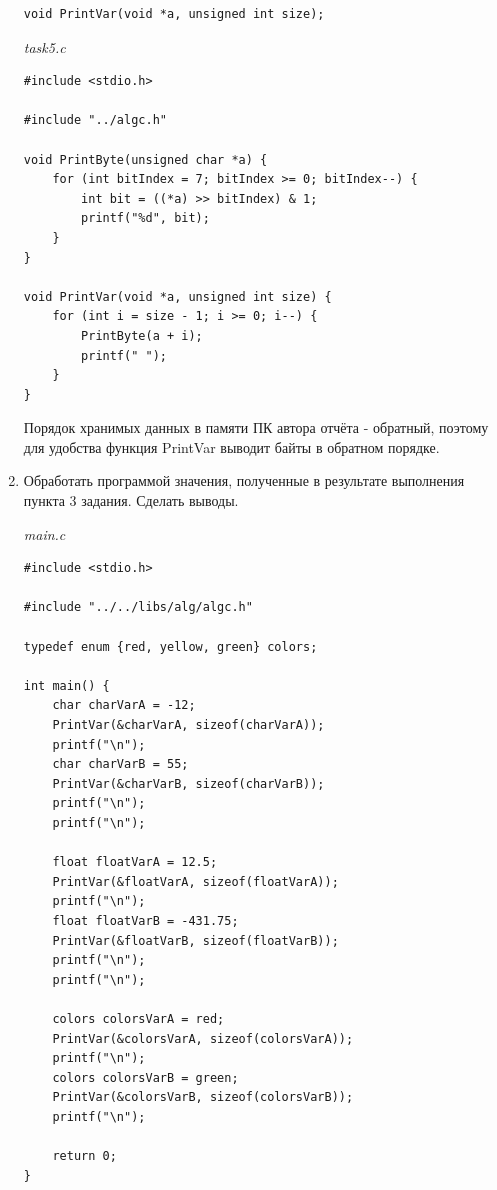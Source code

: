 \documentclass[a4paper,14pt]{extarticle}
\begin{document}
\begin{enumerate}
\begin{verbatim}
void PrintVar(void *a, unsigned int size);
	\end{verbatim}
	      \textit{task5.c}
	      \begin{verbatim}
#include <stdio.h>

#include "../algc.h"

void PrintByte(unsigned char *a) {
    for (int bitIndex = 7; bitIndex >= 0; bitIndex--) {
        int bit = ((*a) >> bitIndex) & 1;
        printf("%d", bit);
    }
}

void PrintVar(void *a, unsigned int size) {
    for (int i = size - 1; i >= 0; i--) {
        PrintByte(a + i);
        printf(" ");
    }
}
	\end{verbatim}
	      Порядок хранимых данных в памяти ПК автора отчёта - обратный, поэтому для удобства
	      функция PrintVar выводит байты в обратном порядке.
	\item Обработать программой значения, полученные в результате выполнения пункта 3 задания. Сделать выводы.

	      \textit{main.c}
	      \begin{verbatim}
#include <stdio.h>

#include "../../libs/alg/algc.h"

typedef enum {red, yellow, green} colors;

int main() {
    char charVarA = -12;
    PrintVar(&charVarA, sizeof(charVarA));
    printf("\n");
    char charVarB = 55;
    PrintVar(&charVarB, sizeof(charVarB));
    printf("\n");
    printf("\n");

    float floatVarA = 12.5;
    PrintVar(&floatVarA, sizeof(floatVarA));
    printf("\n");
    float floatVarB = -431.75;
    PrintVar(&floatVarB, sizeof(floatVarB));
    printf("\n");
    printf("\n");

    colors colorsVarA = red;
    PrintVar(&colorsVarA, sizeof(colorsVarA));
    printf("\n");
    colors colorsVarB = green;
    PrintVar(&colorsVarB, sizeof(colorsVarB));
    printf("\n");

    return 0;
}
\end{verbatim}


\end{enumerate}
\end{document}
